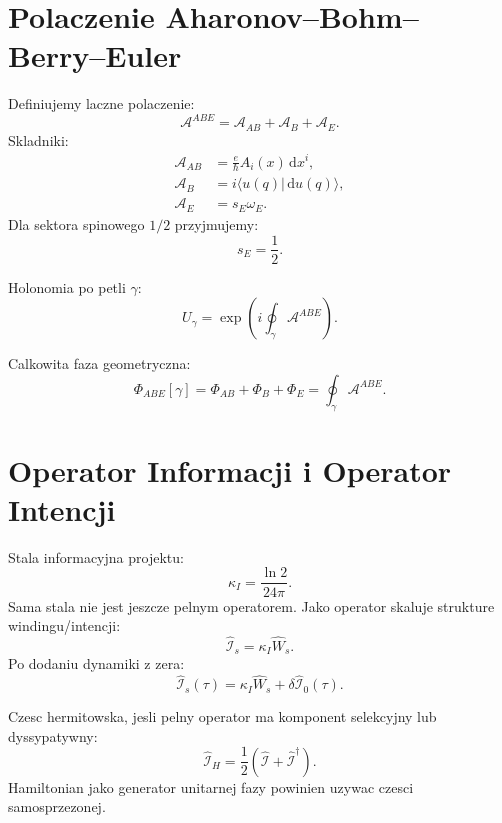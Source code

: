 \documentclass[11pt,a4paper]{article}
\newcommand{\Iop}{\hat{\mathcal I}}
\newcommand{\Wop}{\hat W}
\newcommand{\Abe}{\mathcal A^{ABE}}
\newcommand{\kappaI}{\kappa_I}
\newcommand{\dd}{\,\mathrm d}
\begin{document}
\section{Polaczenie Aharonov--Bohm--Berry--Euler}

Definiujemy laczne polaczenie:
\begin{equation}
\boxed{
\Abe
=
\mathcal A_{AB}+\mathcal A_B+\mathcal A_E.}
\end{equation}
Skladniki:
\begin{align}
\mathcal A_{AB} &= \frac{e}{\hbar}A_i(x)\dd x^i,\\
\mathcal A_B &= i\langle u(q)|\dd u(q)\rangle,\\
\mathcal A_E &= s_E\omega_E.
\end{align}
Dla sektora spinowego $1/2$ przyjmujemy:
\begin{equation}
s_E=\frac12.
\end{equation}

Holonomia po petli $\gamma$:
\begin{equation}
U_\gamma
=
\exp\left(i\oint_\gamma \Abe\right).
\end{equation}

Calkowita faza geometryczna:
\begin{equation}
\Phi_{ABE}[\gamma]
=
\Phi_{AB}+\Phi_B+\Phi_E
=
\oint_\gamma \Abe.
\end{equation}

\section{Operator Informacji i Operator Intencji}

Stala informacyjna projektu:
\begin{equation}
\boxed{\kappaI = \frac{\ln2}{24\pi}.}
\end{equation}
Sama stala nie jest jeszcze pelnym operatorem. Jako operator skaluje strukture windingu/intencji:
\begin{equation}
\boxed{\Iop_s = \kappaI \Wop_s.}
\end{equation}
Po dodaniu dynamiki z zera:
\begin{equation}
\boxed{\Iop_s(\tau)=\kappaI\Wop_s+\delta\Iop_0(\tau).}
\end{equation}

Czesc hermitowska, jesli pelny operator ma komponent selekcyjny lub dyssypatywny:
\begin{equation}
\Iop_{H} = \frac12\left(\Iop+\Iop^\dagger\right).
\end{equation}
Hamiltonian jako generator unitarnej fazy powinien uzywac czesci samosprzezonej.
\end{document}
